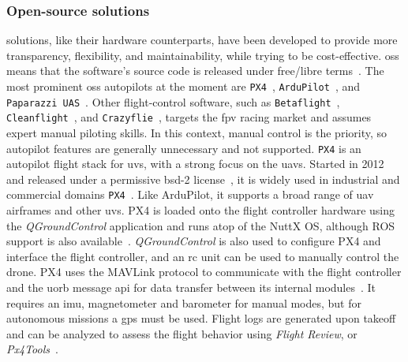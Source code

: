 \subsubsection{Open-source solutions}%
\label{sec:open-source-solut-sw}
 solutions, like their hardware counterparts, have been
developed to provide more transparency, flexibility, and
maintainability, while trying to be cost-effective. \gls{oss} means that the
software's source code is released under free/libre
terms~\cite{freeGNU}. The most prominent \gls{oss} autopilots at the moment are
\lstinline{PX4}~\cite{px4-github},
\lstinline{ArduPilot}~\cite{arduPilot-github}, and
\lstinline{Paparazzi UAS}~\cite{paparazzi-github}.
Other flight-control software, such as
\lstinline{Betaflight}~\cite{betaflight-github},
\lstinline{Cleanflight}~\cite{cleanflight-github}, and
\lstinline{Crazyflie}~\cite{crazyflie-home}, targets the \gls{fpv} racing
market and assumes expert manual piloting skills. In this context, manual
control is the priority, so autopilot features are generally unnecessary and not
supported.
%
%
%
\lstinline{PX4} is an autopilot flight stack for \glspl{uv}, with a strong focus on the
\glspl{uav}. Started in 2012 and released under
a permissive \gls{bsd}-2 license~\cite{px4-github}, it is widely used in
industrial and commercial domains
\lstinline{PX4}~\cite{skynodeX-px4,spRacing-px4}. Like ArduPilot, it supports a
broad range of \gls{uav} airframes and other \glspl{uv}.
%
PX4 is loaded onto
the flight controller hardware using the \emph{QGroundControl}
application and runs atop of the NuttX OS, although ROS support is also
available~\cite{jargalsaikhan2022architectural}. \emph{QGroundControl} is also
used to configure PX4 and interface the flight controller, and an \gls{rc} unit
can be used to manually control the drone.
%
PX4 uses the MAVLink protocol to communicate with the flight controller and the
\gls{uorb} message \gls{api} for data transfer between its internal
modules~\cite{px4-sysArch,jargalsaikhan2022architectural}. It requires an
\gls{imu}, magnetometer and barometer for manual modes, but for autonomous
missions a \gls{gps} must be used. Flight logs are generated upon takeoff and
can be analyzed to assess the flight behavior using \emph{Flight Review}, or
\emph{Px4Tools}~\cite{glossner2021overview}. 


